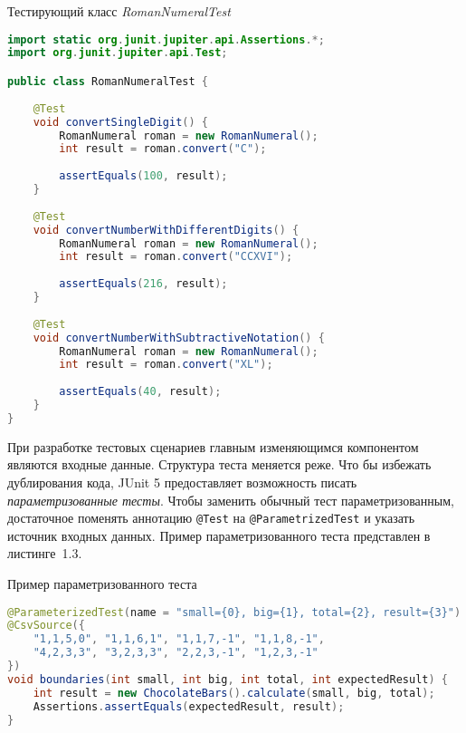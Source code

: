 \begin{ListingEnv}[!h]%
	\captiondelim{ } %
	\caption{Тестирующий класс \textit{RomanNumeralTest}}
	\begin{lstlisting}[language={Java}]
import static org.junit.jupiter.api.Assertions.*;
import org.junit.jupiter.api.Test;

public class RomanNumeralTest {
	
	@Test
	void convertSingleDigit() {
		RomanNumeral roman = new RomanNumeral();
		int result = roman.convert("C");
		
		assertEquals(100, result);
	}
	
	@Test
	void convertNumberWithDifferentDigits() {
		RomanNumeral roman = new RomanNumeral();
		int result = roman.convert("CCXVI");
		
		assertEquals(216, result);
	}
	
	@Test
	void convertNumberWithSubtractiveNotation() {
		RomanNumeral roman = new RomanNumeral();
		int result = roman.convert("XL");
		
		assertEquals(40, result);
	}
}
	\end{lstlisting}
\end{ListingEnv}


При разработке тестовых сценариев главным изменяющимся компонентом являются входные данные. Структура теста меняется реже. Что бы избежать дублирования кода, JUnit 5 предоставляет возможность писать \textit{параметризованные тесты}. Чтобы заменить обычный тест параметризованным, достаточное поменять аннотацию \texttt{@Test} на \texttt{@ParametrizedTest} и указать источник входных данных. Пример параметризованного теста представлен в листинге~1.3.

\begin{ListingEnv}[!h]%
	\captiondelim{ } %
	\caption{Пример параметризованного теста}
	\begin{lstlisting}[language={Java}]
@ParameterizedTest(name = "small={0}, big={1}, total={2}, result={3}")
@CsvSource({
	"1,1,5,0", "1,1,6,1", "1,1,7,-1", "1,1,8,-1",
	"4,2,3,3", "3,2,3,3", "2,2,3,-1", "1,2,3,-1"
})
void boundaries(int small, int big, int total, int expectedResult) {
	int result = new ChocolateBars().calculate(small, big, total);
	Assertions.assertEquals(expectedResult, result);
}
	\end{lstlisting}
\end{ListingEnv}
